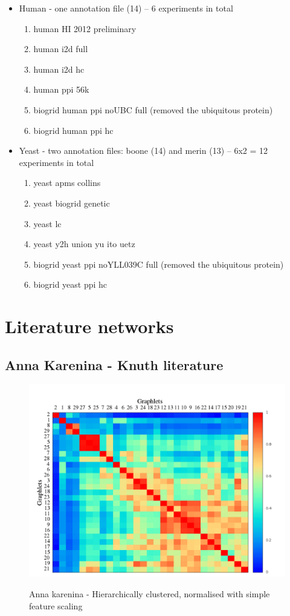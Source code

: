 \documentclass[11pt,a4paper,oneside]{report}
\begin{document}
\begin{itemize}
 \item Human - one annotation file (14) -- 6 experiments in total
 \begin{enumerate}
    \item human HI 2012 preliminary
    \item human i2d full
    \item human i2d hc
    \item human ppi 56k
    \item biogrid human ppi noUBC full (removed the ubiquitous protein)
    \item biogrid human ppi hc
  \end{enumerate}
 \item Yeast - two annotation files: boone (14) and merin (13) -- 6x2 = 12 experiments in total
  \begin{enumerate}
    \item yeast apms collins
    \item yeast biogrid genetic
    \item yeast lc
    \item yeast y2h union yu ito uetz
    \item biogrid yeast ppi noYLL039C full (removed the ubiquitous protein)
    \item biogrid yeast ppi hc
  \end{enumerate}
\end{itemize}

 
\section*{Literature networks}

\subsection*{Anna Karenina - Knuth literature}

\begin{figure}[H]
  \centering
\includegraphics[scale=0.4]
{../code/final_results_norm1/knuth_literature/anna/heatmap_pearsons_hclust_anna.png}
\label{fig:anna-knuth}
\caption{Anna karenina - Hierarchically clustered, normalised with simple feature scaling}
\end{figure}
\end{document}
